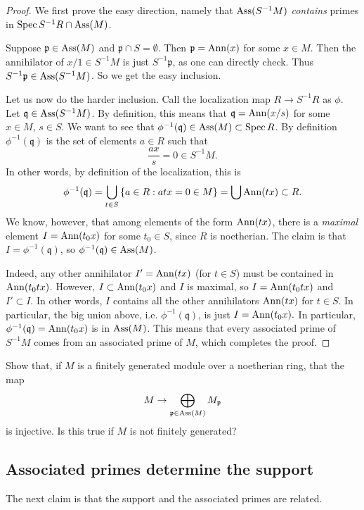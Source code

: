 \begin{proof} 
We first prove the easy direction, namely that $\operatorname{Ass}(S^{-1}M)$
\emph{contains} primes in $\operatorname{Spec} S^{-1}R \cap \operatorname{Ass}(M)$. 

Suppose $\mathfrak{p} \in \operatorname{Ass}(M)$ and
$\mathfrak{p} \cap S = \emptyset$. Then $\mathfrak{p} = \operatorname{Ann}(x)$ for some $x
\in M$. Then the annihilator of $x/1 \in S^{-1}M$ is just $S^{-1}\mathfrak{p}$, as one
can directly check. Thus $S^{-1}\mathfrak{p} \in \operatorname{Ass}(S^{-1}M)$.
So we get the easy inclusion.

Let us now do the harder inclusion.  
Call the localization map $R \to S^{-1}R  $ as $\phi$.
Let $\mathfrak{q} \in \operatorname{Ass}(S^{-1}M)$. By definition, this means that $\mathfrak{q} =
\operatorname{Ann}(x/s)$ for some $x \in M$, $s \in S$. We want to see that
$\phi^{-1}(\mathfrak{q}) \in \operatorname{Ass}(M) \subset \operatorname{Spec} R$.
By definition $\phi^{-1}(\mathfrak{q})$ is the set of elements $a \in R$ such that
\[ \frac{ax}{s} = 0 \in S^{-1}M . \]
In other words, by definition of the localization, this is 
\[  \phi^{-1}(\mathfrak{q}) = \bigcup_{t \in S} \left\{a \in R: atx = 0 \in M\right\} = \bigcup \operatorname{Ann}(tx)
\subset R.\]
We know, however, that among elements of the form $\operatorname{Ann}(tx)$, there is a
\emph{maximal} element $I=\operatorname{Ann}(t_0 x)$ for some $t_0 \in S$, since $R$ is
noetherian.  The claim is that $I = \phi^{-1}(\mathfrak{q})$, so
$\phi^{-1}(\mathfrak{q}) \in \operatorname{Ass}(M)$.

Indeed,  any other annihilator $I' = \operatorname{Ann}(tx)$ (for $t \in S$) must be contained in $\operatorname{Ann}(t_0 t x)$. However, 
\( I \subset \operatorname{Ann}(t_0 x)  \)
and $I$ is maximal, so $I = \operatorname{Ann}(t_0 t x)$ and
\( I' \subset I.  \) In other words, $I$ contains all the other annihilators
$\operatorname{Ann}(tx)$ for $t \in S$.
In particular, the big union above, i.e. $\phi^{-1}(\mathfrak{q})$, is just
\( I = \operatorname{Ann}(t_0 x).  \)
In particular, $\phi^{-1}(\mathfrak{q}) = \operatorname{Ann}(t_0x)$ is in $\operatorname{Ass}(M)$.
This means that every associated prime
of $S^{-1}M$ comes from an associated prime of $M$, which completes the proof.
\end{proof} 



\begin{exercise} 
Show that, if $M$ is a finitely generated module over a noetherian ring, that
the map
\[ M \to \bigoplus_{\mathfrak{p} \in \operatorname{Ass}(M)} M_{\mathfrak{p}}  \]
is injective. Is this true if $M$ is not finitely generated?
\end{exercise} 

\subsection{Associated primes determine the support}
The next claim is that the support and the associated primes are related.

